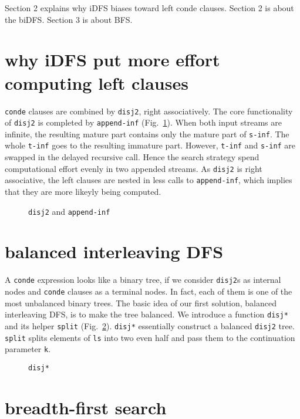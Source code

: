\documentclass[format=acmlarge, review=true, authordraft=true]{acmart}
\begin{document}
Section 2 explains why iDFS biases toward left conde clauses. Section 2 is about the biDFS. Section 3 is about BFS.

\section{why iDFS put more effort computing left clauses}

\texttt{conde} clauses are combined by \texttt{disj2}, right associatively. The core functionality of \texttt{disj2} is completed by \texttt{append-inf} (Fig.~\ref{disj2-and-append-inf}). When both input streams are infinite, the resulting mature part contains only the mature part of \texttt{s-inf}. The whole \texttt{t-inf} goes to the resulting immature part. However, \texttt{t-inf} and \texttt{s-inf} are swapped in the delayed recursive call. Hence the search strategy spend computational effort evenly in two appended streams. As \texttt{disj2} is right associative, the left clauses are nested in less calls to \texttt{append-inf}, which implies that they are more likeyly being computed.

\begin{figure}
  
  \caption{\texttt{disj2} and \texttt{append-inf}}
  \label{disj2-and-append-inf}
\end{figure}
 
\section{balanced interleaving DFS}

A \texttt{conde} expression looks like a binary tree, if we consider \texttt{disj2}s as internal nodes and \texttt{conde} clauses as a terminal nodes. In fact, each of them is one of the most unbalanced binary trees. The basic idea of our first solution, balanced interleaving DFS, is to make the tree balanced. We introduce a function \texttt{disj*} and its helper \texttt{split} (Fig.~\ref{disj*}). \texttt{disj*} essentially construct a balanced \texttt{disj2} tree. \texttt{split} splits elements of \texttt{ls} into two even half and pass them to the continuation parameter \texttt{k}.

\begin{figure}
  
  \caption{\texttt{disj*}}
  \label{disj*}
\end{figure}

\section{breadth-first search}
\end{document}
